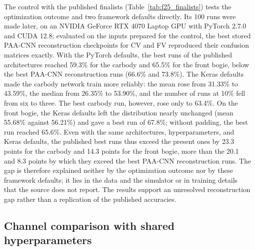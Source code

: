 The control with the published finalists (Table~\ref{tab:f25_finalists}) tests
the optimization outcome and two framework defaults directly. Its 100 runs were
made later, on an NVIDIA GeForce RTX 4070 Laptop GPU with PyTorch 2.7.0 and
CUDA 12.8; evaluated on the inputs prepared for the control, the best stored
PAA-CNN reconstruction checkpoints for CV and FV reproduced their confusion
matrices exactly. With the PyTorch defaults, the best runs of the published
architectures reached 59.3\% for the carbody and 65.5\% for the front bogie,
below the best PAA-CNN reconstruction runs (66.6\% and 73.8\%). The Keras
defaults made the carbody network train more reliably: the mean rose from
31.33\% to 43.59\%, the median from 26.35\% to 53.90\%, and the number of runs
at 10\% fell from six to three. The best carbody run, however, rose only to
63.4\%. On the front bogie, the Keras defaults left the distribution nearly
unchanged (mean 55.68\% against 56.21\%) and gave a best run of 67.8\%; without
padding, the best run reached 65.6\%. Even with the same architectures,
hyperparameters, and Keras defaults, the published best runs thus exceed the
present ones by 23.3 points for the carbody and 14.3 points for the front
bogie, more than the 20.1 and 8.3 points by which they exceed the best PAA-CNN
reconstruction runs. The gap is therefore explained neither by the
optimization outcome nor by these framework defaults; it lies in the data and
the simulator or in training details that the source does not report. The
results support an unresolved reconstruction gap rather than a replication of
the published accuracies.

\begin{table}[htbp]
\centering
\caption{Ten-class test accuracy of the two PAA-CNN finalists published by the
source, trained on the present data with their reported hyperparameters (mean
$\pm$ sample SD over 20 runs). With convolutions that preserve the length and
pooling that rounds up (Same), the front-bogie network has the 7,008 flattened
units implied by the source; without padding (None), it has 6,816. Keras
denotes Glorot-uniform initialization with zero biases and the Keras form of
the Adam update. The best PAA-CNN reconstruction runs reached 66.6\% (CV) and
73.8\% (FV), and the source reports 86.7\% and 82.1\%.}
\label{tab:f25_finalists}
\small

\end{table}

\subsection{Channel comparison with shared hyperparameters}
\label{sec:shared}

